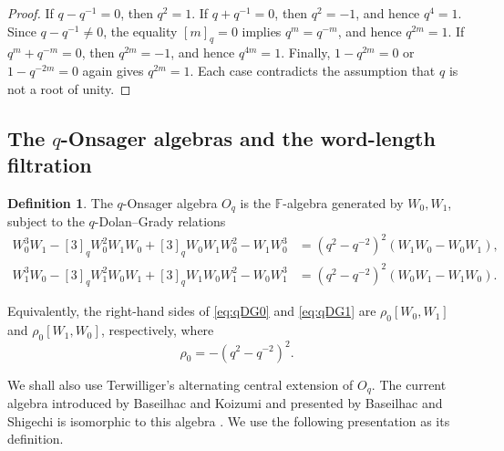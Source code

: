 \documentclass[11pt]{extarticle}
\theoremstyle{definition}
\newtheorem{definition}[theorem]{Definition}
\theoremstyle{remark}
\numberwithin{equation}{section}
\newcommand{\F}{\mathbb F}
\newcommand{\Oq}{O_q}
\newcommand{\comm}[2]{[ #1,#2 ]}
\begin{document}
\begin{proof}
If \(q-q^{-1}=0\), then \(q^2=1\).  If \(q+q^{-1}=0\), then
\(q^2=-1\), and hence \(q^4=1\).  Since \(q-q^{-1}\neq0\), the equality
\([m]_q=0\) implies \(q^m=q^{-m}\), and hence \(q^{2m}=1\).  If
\(q^m+q^{-m}=0\), then \(q^{2m}=-1\), and hence \(q^{4m}=1\).  Finally,
\(1-q^{2m}=0\) or \(1-q^{-2m}=0\) again gives \(q^{2m}=1\).  Each case
contradicts the assumption that \(q\) is not a root of unity.
\end{proof}

\subsection{The \texorpdfstring{\(q\)}{q}-Onsager algebras and the word-length filtration}

\begin{definition}
\label{def:Oq}
The \(q\)-Onsager algebra \(\Oq\) is the \(\F\)-algebra generated by
\(W_0,W_1\), subject to the \(q\)-Dolan--Grady relations
\begin{align}
W_0^3W_1-[3]_qW_0^2W_1W_0+[3]_qW_0W_1W_0^2-W_1W_0^3
   &=(q^2-q^{-2})^2(W_1W_0-W_0W_1),
\label{eq:qDG0}\\
W_1^3W_0-[3]_qW_1^2W_0W_1+[3]_qW_1W_0W_1^2-W_0W_1^3
   &=(q^2-q^{-2})^2(W_0W_1-W_1W_0).
\label{eq:qDG1}
\end{align}
\end{definition}

Equivalently,
the right-hand sides of \eqref{eq:qDG0} and \eqref{eq:qDG1} are
\(\rho_0\comm{W_0}{W_1}\) and \(\rho_0\comm{W_1}{W_0}\), respectively, where
\begin{equation}
\label{eq:rho0}
        \rho_0=-(q^2-q^{-2})^2 .
\end{equation}

We shall also use Terwilliger's alternating central extension of
\(\Oq\).  The current algebra introduced by Baseilhac and Koizumi and
presented by Baseilhac and Shigechi is isomorphic to this algebra
\cite{BaseilhacKoizumi2005,BaseilhacShigechi2010,Terwilliger2021ACE}.  We
use the following presentation as its definition.
\end{document}
